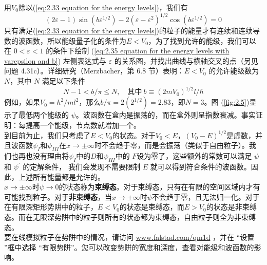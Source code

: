	用$V_0$除以(\ref{eq:2.33 equation for the energy levels})，我们有
	\begin{equation}
		\left(2\varepsilon-1\right)\sin\left(b\varepsilon^{1/2}\right) - 2\left(\varepsilon - \varepsilon^2 \right)^{1/2}\cos\left(b\varepsilon^{1/2}\right) = 0
		\label{eq:2.35 equation for the energy levels with varepsilon and b}
	\end{equation}
	只有满足(\ref{eq:2.33 equation for the energy levels})的粒子的能量才有连续和连续导数的波函数，所以能级量子化的条件为$E<V_0$，为了找到允许的能级，我们可以在 $0<\varepsilon<1$ 的条件下绘制 (\ref{eq:2.35 equation for the energy levels with varepsilon and b}) 左侧表达式与 $\varepsilon$ 的关系图，并找出曲线与横轴交叉的点（另见问题 4.31c）。详细研究（Merzbacher，第 6.8 节）表明：$E<V_0$ 的允许能级数为 $N$，其中 $N$ 满足以下条件
	\begin{equation}
		N-1 < b/\pi \le N, \quad \text{其中}\: b \equiv \left(2mV_0\right)^{1/2}l /\hbar
		\label{eq:2.36 requirement for allowed energy levels' number N}
	\end{equation}
	例如，如果$V_0 = h^2/ml^2$，那么$b/\pi = 2\left(2^{1/2}\right) = 2.83$，即$N=3$。图 (\ref{fig:2.5})显示了最低两个能级的 $\psi$。波函数在盒内是振荡的，而在盒外则呈指数衰减。事实证明：每提高一个能级，节点数就增加一个。\\
	\indent 到目前为止，我们只考虑了$E<V_0$的状态。对于$V_0<E$，$\left(V_0-E\right)^{1/2}$是虚数，并且波函数$\psi_I$和$\psi_{III}$在$x \to \pm \infty$时不会趋于零，而是会振荡（类似于自由粒子）。我们也再也没有理由将$\psi_I$中的$D$和$\psi_{III}$中的 $F$设为零了，这些额外的常数可以满足 $\psi$ 和 $\psi^{\prime}$ 的定解条件，
	我们会发现不需要限制 $E$ 就可以得到符合条件的波函数。因此，上述所有能量都是允许的。\\
	\indent $x \to \pm \infty$时$\psi \to 0$的状态称为\textbf{束缚态}。对于束缚态，只有在有限的空间区域内才有可能找到粒子。对于\textbf{非束缚态}，当$x \to \pm \infty$时$\psi$不会趋于零，且无法归一化。对于在有限深矩形势阱中的粒子，$E<V_0$的状态是束缚态，而$E>V_0$的状态是非束缚态。而在无限深势阱中的粒子则所有的状态都为束缚态，自由粒子则全为非束缚态。\\
	\indent 要在线模拟粒子在势阱中的情况，请访问 \url{www.falstad.com/qm1d} ，并在 “设置 ”框中选择 “有限势阱”。您可以改变势阱的宽度和深度，查看对能级和波函数的影响。
	
